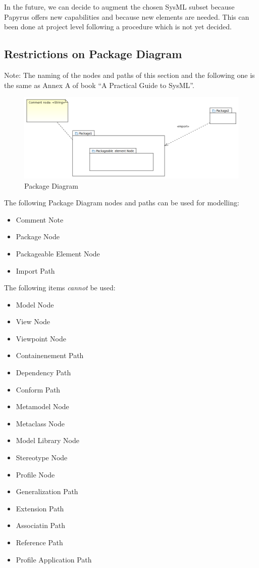 In the future, we can decide to augment the chosen SysML subset
because Papyrus offers new capabilities and because new elements are
needed. This can been done at project level following a procedure
which is not yet decided.

\subsection{Restrictions on Package Diagram}

Note: The naming of the nodes and paths of this section and the
following one is the same as Annex A of book ``A Practical Guide to
SysML''.


\begin{figure}[ht]
  \centering
  \includegraphics[width=\textwidth]{images/PackageDiagram.PNG}
  \caption{Package Diagram}
  \label{fig:package diagram}
\end{figure}


The following Package Diagram nodes and paths can be used for
modelling:
\begin{itemize}
\item Comment Note 
\item Package Node 
\item Packageable Element Node
\item Import Path 
\end{itemize}

The following items \emph{cannot} be used:
\begin{itemize}
\item Model Node
\item View Node
\item Viewpoint Node
\item Containenement Path
\item Dependency Path
\item Conform Path
\item Metamodel Node
\item Metaclass Node
\item Model Library Node
\item Stereotype Node
\item Profile Node
\item Generalization Path
\item Extension Path
\item Associatin Path
\item Reference Path
\item Profile Application Path
\end{itemize}

